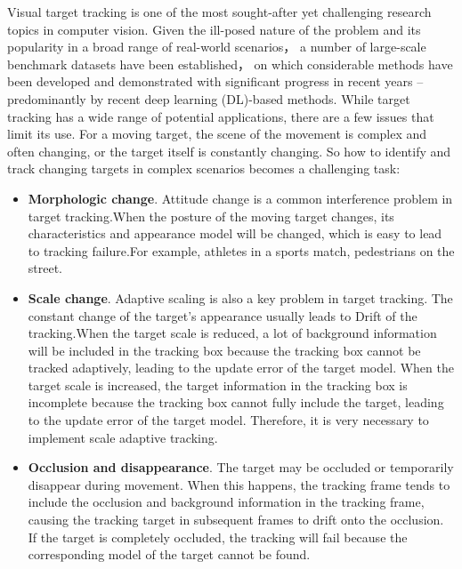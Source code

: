 \documentclass[promaster]{thesis-uestc}
\begin{document}
\begin{englishabstract}
Visual target tracking is one of the most sought-after yet challenging research topics in computer vision. Given the ill-posed
nature of the problem and its popularity in a broad range of real-world scenarios， a number of large-scale benchmark datasets have
been established， on which considerable methods have been developed and demonstrated with significant progress in recent years –
predominantly by recent deep learning (DL)-based methods. While target tracking has a wide range of potential applications, there are a few issues that limit its use.
For a moving target, the scene of the movement is complex and often changing, or the target itself is constantly changing.
So how to identify and track changing targets in complex scenarios becomes a challenging task:
\begin{itemize}
    \item \textbf{Morphologic change}. Attitude change is a common interference problem in target tracking.When the posture of the moving target changes, its characteristics and appearance model will be changed, which is easy to lead to tracking failure.For example, athletes in a sports match, pedestrians on the street.
    \item \textbf{Scale change}. Adaptive scaling is also a key problem in target tracking. The constant change of the target's appearance usually leads to Drift of the tracking.When the target scale is reduced, a lot of background information will be included in the tracking box because the tracking box cannot be tracked adaptively, leading to the update error of the target model. When the target scale is increased, the target information in the tracking box is incomplete because the tracking box cannot fully include the target, leading to the update error of the target model. 
    Therefore, it is very necessary to implement scale adaptive tracking.
    \item \textbf{Occlusion and disappearance}. The target may be occluded or temporarily disappear during movement. When this happens, the tracking frame tends to include the occlusion and background information in the tracking frame, causing the tracking target in subsequent frames to drift onto the occlusion. If the target is completely occluded, the tracking will fail because the corresponding model of the target cannot be found.

\end{itemize}
\end{englishabstract}
\end{document}
